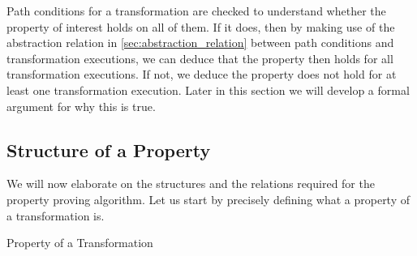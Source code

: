 Path conditions for a transformation are checked to understand whether the property of interest holds on all of them. If it does, then by making use of the abstraction relation in \cref{sec:abstraction_relation} between path conditions and transformation executions, we can deduce that the property then holds for all transformation executions. If not, we deduce the property does not hold for at least one transformation execution. Later in this section we will develop a formal argument for why this is true.

\subsection{Structure of a Property}
We will now elaborate on the structures and the relations required for the property proving algorithm. Let us start by precisely defining what a property of a transformation is. 


\begin{definition}{Property of a Transformation\\}
\label{def:trans_prop}
\end{definition}




